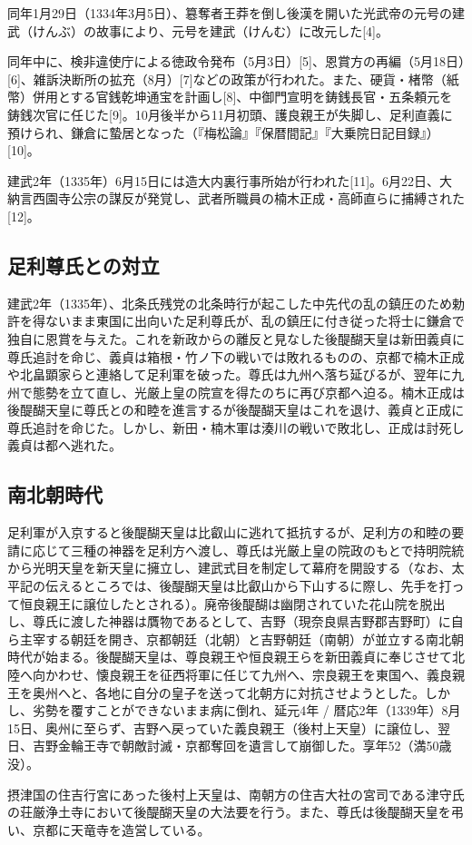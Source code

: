 \documentclass[twocolumn]{jsarticle}
\begin{document}
同年1月29日（1334年3月5日）、簒奪者王莽を倒し後漢を開いた光武帝の元号の建武（けんぶ）の故事により、元号を建武（けんむ）に改元した[4]。

同年中に、検非違使庁による徳政令発布（5月3日）[5]、恩賞方の再編（5月18日）[6]、雑訴決断所の拡充（8月）[7]などの政策が行われた。また、硬貨・楮幣（紙幣）併用とする官銭乾坤通宝を計画し[8]、中御門宣明を鋳銭長官・五条頼元を鋳銭次官に任じた[9]。10月後半から11月初頭、護良親王が失脚し、足利直義に預けられ、鎌倉に蟄居となった（『梅松論』『保暦間記』『大乗院日記目録』）[10]。

建武2年（1335年）6月15日には造大内裏行事所始が行われた[11]。6月22日、大納言西園寺公宗の謀反が発覚し、武者所職員の楠木正成・高師直らに捕縛された[12]。

\subsection{足利尊氏との対立}

建武2年（1335年）、北条氏残党の北条時行が起こした中先代の乱の鎮圧のため勅許を得ないまま東国に出向いた足利尊氏が、乱の鎮圧に付き従った将士に鎌倉で独自に恩賞を与えた。これを新政からの離反と見なした後醍醐天皇は新田義貞に尊氏追討を命じ、義貞は箱根・竹ノ下の戦いでは敗れるものの、京都で楠木正成や北畠顕家らと連絡して足利軍を破った。尊氏は九州へ落ち延びるが、翌年に九州で態勢を立て直し、光厳上皇の院宣を得たのちに再び京都へ迫る。楠木正成は後醍醐天皇に尊氏との和睦を進言するが後醍醐天皇はこれを退け、義貞と正成に尊氏追討を命じた。しかし、新田・楠木軍は湊川の戦いで敗北し、正成は討死し義貞は都へ逃れた。

\subsection{南北朝時代}

足利軍が入京すると後醍醐天皇は比叡山に逃れて抵抗するが、足利方の和睦の要請に応じて三種の神器を足利方へ渡し、尊氏は光厳上皇の院政のもとで持明院統から光明天皇を新天皇に擁立し、建武式目を制定して幕府を開設する（なお、太平記の伝えるところでは、後醍醐天皇は比叡山から下山するに際し、先手を打って恒良親王に譲位したとされる）。廃帝後醍醐は幽閉されていた花山院を脱出し、尊氏に渡した神器は贋物であるとして、吉野（現奈良県吉野郡吉野町）に自ら主宰する朝廷を開き、京都朝廷（北朝）と吉野朝廷（南朝）が並立する南北朝時代が始まる。後醍醐天皇は、尊良親王や恒良親王らを新田義貞に奉じさせて北陸へ向かわせ、懐良親王を征西将軍に任じて九州へ、宗良親王を東国へ、義良親王を奥州へと、各地に自分の皇子を送って北朝方に対抗させようとした。しかし、劣勢を覆すことができないまま病に倒れ、延元4年 / 暦応2年（1339年）8月15日、奥州に至らず、吉野へ戻っていた義良親王（後村上天皇）に譲位し、翌日、吉野金輪王寺で朝敵討滅・京都奪回を遺言して崩御した。享年52（満50歳没）。

摂津国の住吉行宮にあった後村上天皇は、南朝方の住吉大社の宮司である津守氏の荘厳浄土寺において後醍醐天皇の大法要を行う。また、尊氏は後醍醐天皇を弔い、京都に天竜寺を造営している。
\end{document}
